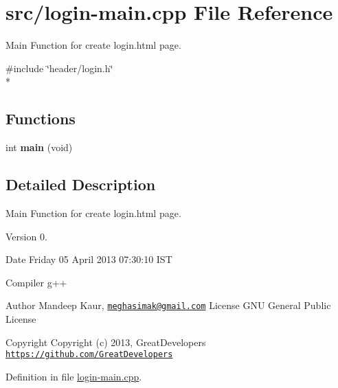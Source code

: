 \hypertarget{login-main_8cpp}{\section{src/login-\/main.cpp File Reference}
\label{login-main_8cpp}
}


Main Function for create login.\-html page.  


{\ttfamily \#include \char`\"{}header/login.\-h\char`\"{}}\\*
\subsection*{Functions}
\begin{DoxyCompactItemize}
\item 
\hypertarget{login-main_8cpp_a840291bc02cba5474a4cb46a9b9566fe}{int {\bfseries main} (void)}\label{login-main_8cpp_a840291bc02cba5474a4cb46a9b9566fe}

\end{DoxyCompactItemize}


\subsection{Detailed Description}
Main Function for create login.\-html page. \begin{DoxyVersion}{Version}
0. 
\end{DoxyVersion}
\begin{DoxyDate}{Date}
Friday 05 April 2013 07\-:30\-:10 I\-S\-T\par
 Compiler g++
\end{DoxyDate}
\begin{DoxyAuthor}{Author}
Mandeep Kaur, \href{mailto:meghasimak@gmail.com}{\tt meghasimak@gmail.\-com} License G\-N\-U General Public License 
\end{DoxyAuthor}
\begin{DoxyCopyright}{Copyright}
Copyright (c) 2013, Great\-Developers \href{https://github.com/GreatDevelopers}{\tt https\-://github.\-com/\-Great\-Developers} 
\end{DoxyCopyright}


Definition in file \hyperlink{login-main_8cpp_source}{login-\/main.\-cpp}.

